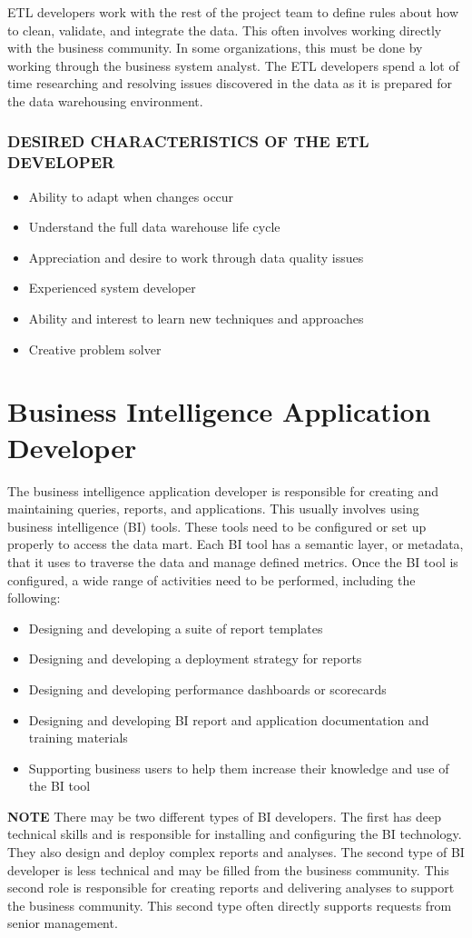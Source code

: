 \documentclass{vldb}
\newcommand{\bi}{\begin{itemize}}
\newcommand{\ei}{\end{itemize}}
\newcommand{\ii}{\item}
\begin{document}
ETL developers work with the rest of the project team to define rules about how to clean, validate, and integrate the data. This often involves working directly with the business community. In some organizations, this must be done by working through the business system analyst. The ETL developers spend a lot of time researching and resolving issues discovered in the data as it is prepared for the data warehousing environment.


\subsubsection*{DESIRED CHARACTERISTICS OF THE ETL DEVELOPER}

\bi
\ii Ability to adapt when changes occur
\ii Understand the full data warehouse life cycle
\ii Appreciation and desire to work through data quality issues 
\ii Experienced system developer
\ii Ability and interest to learn new techniques and approaches 
\ii Creative problem solver
\ei

\section{Business Intelligence Application Developer}
The business intelligence application developer is responsible for creating and maintaining queries, reports, and applications. This usually involves using business intelligence (BI) tools. These tools need to be configured or set up properly to access the data mart. Each BI tool has a semantic layer, or metadata, that it uses to traverse the data and manage defined metrics. Once the BI tool is configured, a wide range of activities need to be performed, including the following:
\bi
\ii Designing and developing a suite of report templates
\ii Designing and developing a deployment strategy for reports
\ii Designing and developing performance dashboards or scorecards
\ii Designing and developing BI report and application documentation and training materials
\ii Supporting business users to help them increase their knowledge and use of the BI tool
\ei

\noindent
\textbf{NOTE} There may be two different types of BI developers. The first has deep technical skills and is responsible for installing and configuring the BI technology. They also design and deploy complex reports and analyses. The second type of BI developer is less technical and may be filled from the business community. This second role is responsible for creating reports and delivering analyses to support the business community. This second type often directly supports requests from
senior management.
\end{document}
